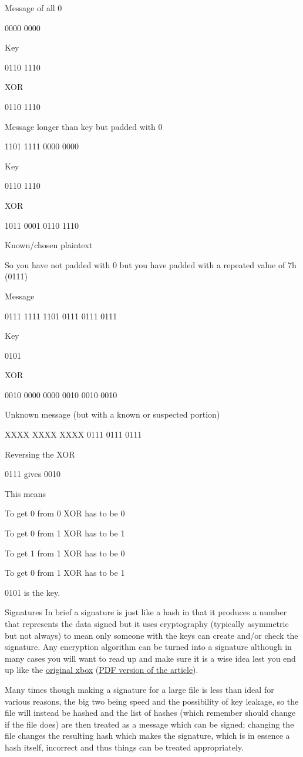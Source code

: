\documentclass[
]{book}
\begin{document}
Message of all 0

0000 0000

Key

0110 1110

XOR

0110 1110

Message longer than key but padded with 0

1101 1111 0000 0000

Key

0110 1110

XOR

1011 0001 0110 1110

Known/chosen plaintext

So you have not padded with 0 but you have padded with a repeated value of 7h (0111)

Message

0111 1111 1101 0111 0111 0111

Key

0101

XOR

0010 0000 0000 0010 0010 0010

Unknown message (but with a known or suspected portion)

XXXX XXXX XXXX 0111 0111 0111

Reversing the XOR

0111 gives 0010

This means

To get 0 from 0 XOR has to be 0

To get 0 from 1 XOR has to be 1

To get 1 from 1 XOR has to be 0

To get 0 from 1 XOR has to be 1

0101 is the key.

Signatures In brief a signature is just like a hash in that it produces a number that represents the data signed but it uses cryptography (typically asymmetric but not always) to mean only someone with the keys can create and/or check the signature. Any encryption algorithm can be turned into a signature although in many cases you will want to read up and make sure it is a wise idea lest you end up like the \href{http://web.archive.org/web/20090212084156/http://xbox-linux.org/wiki/17_Mistakes_Microsoft_Made_in_the_Xbox_Security_System}{original xbox} (\href{http://events.ccc.de/congress/2005/fahrplan/attachments/591-paper_xbox.pdf}{PDF version of the article}).

Many times though making a signature for a large file is less than ideal for various reasons, the big two being speed and the possibility of key leakage, so the file will instead be hashed and the list of hashes (which remember should change if the file does) are then treated as a message which can be signed; changing the file changes the resulting hash which makes the signature, which is in essence a hash itself, incorrect and thus things can be treated appropriately.
\end{document}
